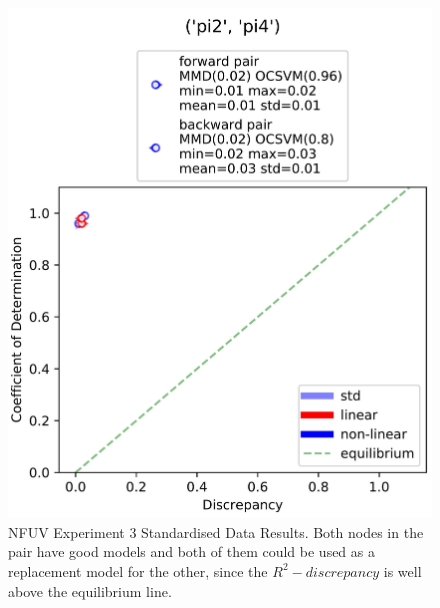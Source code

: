\documentclass{mpaper}
\begin{document}
\begin{figure}
    \centering
    \includegraphics[scale = 0.09]{experiment_3_std.jpg}
    \caption{NFUV Experiment 3 Standardised Data Results. Both nodes in the pair have good models and both of them could be used as a replacement model for the other, since the $R^2 - discrepancy$ is well above the equilibrium line.}
    \label{fig:gnfuv_exp3_std}
\end{figure}
\end{document}

